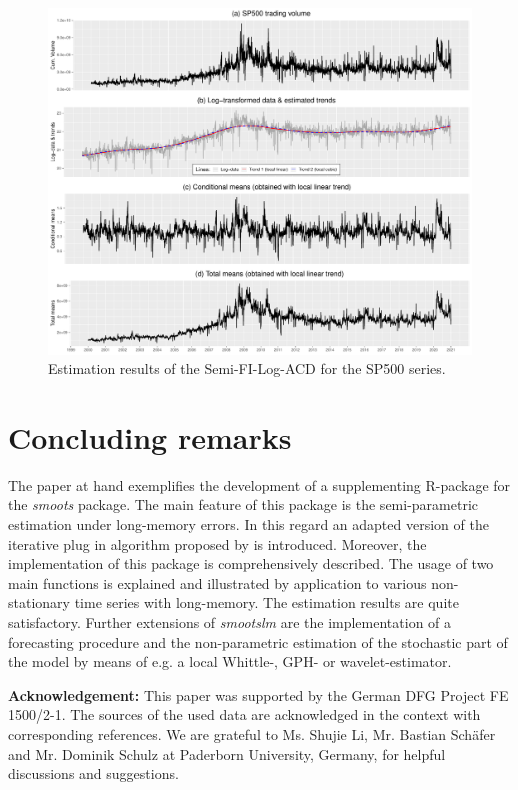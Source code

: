 \documentclass[12pt]{article}
\begin{document}
 
 \begin{figure}[h!]
 	\includegraphics[trim = {0cm 0mm 0mm 0mm}, width = \textwidth]{Abb/SP500VOL.pdf}
 	\caption{Estimation results of the Semi-FI-Log-ACD for the SP500 series.}
 \end{figure}


\section{Concluding remarks}
The paper at hand exemplifies the development of a supplementing R-package for the \textit{smoots} package. The main feature of this package is the semi-parametric estimation under long-memory errors. In this regard an adapted version of the iterative plug in algorithm proposed by \citet{beran2002iterative} is introduced. Moreover, the implementation of this package is comprehensively described. The usage of two main functions is explained and illustrated by application to various non-stationary time series with long-memory. The estimation results are quite satisfactory. Further extensions of \textit{smootslm} are the implementation of a forecasting procedure and the non-parametric estimation of the stochastic part of the model by means of e.g.  a local Whittle-, GPH- or wavelet-estimator.

\vfill
\textbf{Acknowledgement:} This paper was supported by the German DFG Project FE 1500/2-1. The sources of the used data are acknowledged in the context with corresponding references. We are grateful to Ms. Shujie Li, Mr. Bastian Schäfer and Mr. Dominik Schulz at Paderborn University, Germany, for helpful discussions and suggestions.
\clearpage

\printbibliography


\clearpage
\end{document}
